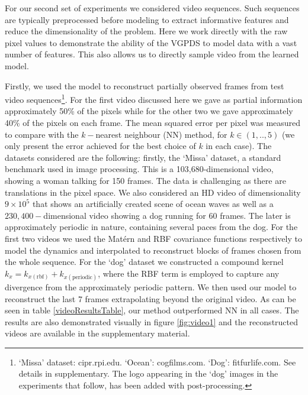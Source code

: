 \documentclass{article} %
\begin{document}
For our second set of experiments we considered video sequences. Such
sequences are typically preprocessed before modeling to extract
informative features and reduce the dimensionality of the
problem. Here we work directly with the raw pixel values to
demonstrate the ability of the VGPDS to model data with a vast number
of features. This also allows us to directly sample video from the
learned model.
\par Firstly, we used the
model to reconstruct partially observed frames from test video
sequences\footnote{`Missa' dataset: cipr.rpi.edu. `Ocean': cogfilms.com. `Dog': fitfurlife.com. See details in supplementary. The logo appearing in the `dog' images in the experiments that follow, has been added with post-processing.}. For the first video discussed here we gave as partial information approximately 
50\% of the pixels while for the other two we gave approximately 40\% of the pixels on each frame.
The mean squared error per pixel was measured to compare
with the $k-$nearest neighbour (NN) method, for $k \in (1,..,5)$ (we
only present the error achieved for the best choice of $k$ in each
case). The datasets considered are the following: firstly, the `Missa'
dataset, a standard benchmark used in image
processing. This is a 103,680-dimensional video, showing a woman talking
for 150 frames. The data is challenging as there are translations in
the pixel space. We also considered an HD video of dimensionality $9
\times 10^5$ that shows an artificially created scene of ocean waves
as well as a $230,400-$dimensional video showing
a dog running for $60$ frames. The later is approximately periodic in
nature, containing several paces from the dog. For the first two
videos we used the Mat\'ern and RBF covariance functions respectively to model the
dynamics and interpolated to reconstruct blocks of frames chosen from
the whole sequence. For the `dog' dataset we constructed a compound
kernel $k_x = k_{x(\text{rbf})} + k_{x(\text{periodic})}$, where the
RBF term is employed to capture any divergence from the approximately
periodic pattern. We then used our model to reconstruct the last 7
frames extrapolating beyond the original video. As can be seen in
table \ref{videoResultsTable}, our method outperformed NN in all
cases. The results are also demonstrated visually in figure
\ref{fig:video1} and the reconstructed videos are available in the supplementary material.
\end{document}
